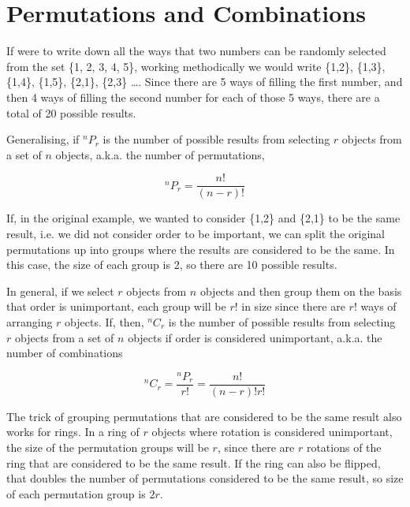 \documentclass[a5paper]{article}
\begin{document}
\section{Permutations and Combinations}

If were to write down all the ways that two numbers can be randomly selected from
the set \{1, 2, 3, 4, 5\}, working methodically we would write \{1,2\}, \{1,3\},
\{1,4\}, \{1,5\}, \{2,1\}, \{2,3\} \ldots. Since there are 5 ways of filling the
first number, and then 4 ways of filling the second number for each of those
5 ways, there are a total of 20 possible results.

Generalising, if ${}^nP_r$ is the number of possible results from selecting $r$
objects from a set of $n$ objects, a.k.a. the number of permutations,

\begin{equation}
  {}^nP_r = \frac{n!}{(n-r)!}
\end{equation}

If, in the original example, we wanted to consider \{1,2\} and \{2,1\} to be the
same result, i.e. we did not consider order to be important, we can split the
original permutations up into groups where the results are considered to be the
same. In this case, the size of each group is 2, so there are 10 possible
results.

In general, if we select $r$ objects from $n$ objects and then group them on the
basis that order is unimportant, each group will be $r!$ in size since there are
$r!$ ways of arranging $r$ objects. If, then, ${}^nC_r$ is the number of
possible results from selecting $r$ objects from a set of $n$ objects if order
is considered unimportant, a.k.a. the number of combinations

\begin{equation}
  {}^nC_r = \frac{{}^nP_r}{r!} = \frac{n!}{(n-r)!r!}
\end{equation}

The trick of grouping permutations that are considered to be the same result
also works for rings. In a ring of $r$ objects where rotation is considered
unimportant, the size of the permutation groups will be $r$, since there are $r$
rotations of the ring that are considered to be the same result. If the ring can
also be flipped, that doubles the number of permutations considered to be the
same result, so size of each permutation group is $2r$.
\end{document}
